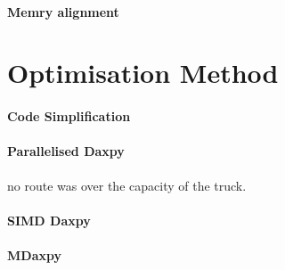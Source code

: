 \documentclass[conference]{acmsiggraph}
\begin{document}
\paragraph{Memry alignment}


\section{Optimisation Method}

\paragraph{Code Simplification}

\paragraph{Parallelised Daxpy}
 no route was over the capacity of the truck.

\paragraph{SIMD Daxpy}


\paragraph{MDaxpy}


\afterpage{\clearpage}
\end{document}
